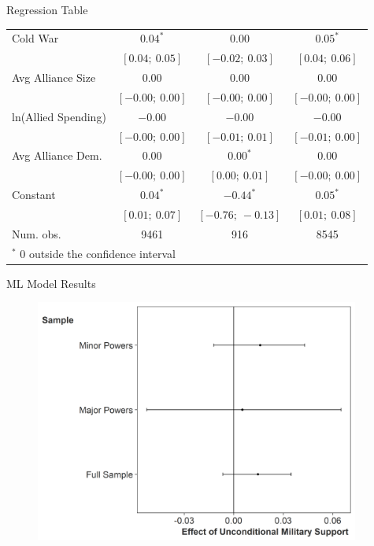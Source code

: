 \documentclass{beamer}
\begin{document}
\begin{frame}{Regression Table}
\begin{table}
\begin{center}
{\begin{tabular}{l c c c }
Cold War          & $0.04^{*}$        & $0.00$            & $0.05^{*}$       \\
                   & $[0.04;\ 0.05]$   & $[-0.02;\ 0.03]$  & $[0.04;\ 0.06]$  \\
Avg Alliance Size        & $0.00$            & $0.00$            & $0.00$           \\
                   & $[-0.00;\ 0.00]$  & $[-0.00;\ 0.00]$  & $[-0.00;\ 0.00]$ \\
ln(Allied Spending)     & $-0.00$           & $-0.00$           & $-0.00$          \\
                   & $[-0.00;\ 0.00]$  & $[-0.01;\ 0.01]$  & $[-0.01;\ 0.00]$ \\
Avg Alliance Dem.      & $0.00$            & $0.00^{*}$        & $0.00$           \\
                   & $[-0.00;\ 0.00]$  & $[0.00;\ 0.01]$   & $[-0.00;\ 0.00]$ \\
Constant       & $0.04^{*}$        & $-0.44^{*}$       & $0.05^{*}$       \\
                   & $[0.01;\ 0.07]$   & $[-0.76;\ -0.13]$ & $[0.01;\ 0.08]$  \\									
\hline
Num. obs.          & 9461              & 916               & 8545             \\
\hline
\multicolumn{4}{l}{\scriptsize{$^*$ 0 outside the confidence interval}}
\end{tabular}
}
\label{table:coefficients}
\end{center}
\end{table}


\end{frame}


\begin{frame}{ML Model Results}


\begin{figure}
	\centering
		\includegraphics[width=0.95\textwidth]{ml-model-uncond-coefs.png}
	\label{fig:ml-model-uncond-coefs}
\end{figure}


\end{frame}
\end{document}
